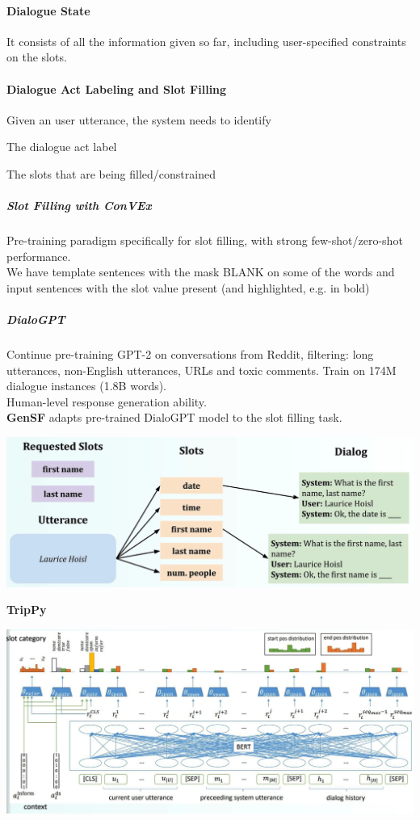\documentclass[10pt]{report}
\begin{document}
\paragraph{Dialogue State} It consists of all the information given so far, including user-specified constraints on the slots.
\paragraph{Dialogue Act Labeling and Slot Filling} Given an user utterance, the system needs to identify
\begin{list}{}{}
	\item The dialogue act label
	\item The slots that are being filled/constrained
\end{list}
\subparagraph{Slot Filling with ConVEx} Pre-training paradigm specifically for slot filling, with strong few-shot/zero-shot performance.\\
We have template sentences with the mask BLANK on some of the words and input sentences with the slot value present (and highlighted, e.g. in bold)
\subparagraph{DialoGPT} Continue pre-training GPT-2 on conversations from Reddit, filtering: long utterances, non-English utterances, URLs and toxic comments. Train on 174M dialogue instances (1.8B words).\\
Human-level response generation ability.\\
\textbf{GenSF} adapts pre-trained DialoGPT model to the slot filling task.
\begin{center}
	\includegraphics[scale=0.5]{119.png}
\end{center}
\textbf{TripPy}
\begin{center}
	\includegraphics[scale=0.5]{120.png}
\end{center}
\pagebreak
\end{document}

